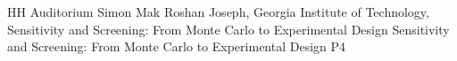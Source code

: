 \tablePlenary{} %
{HH Auditorium}	%
{Simon Mak}		%
{Roshan Joseph, Georgia Institute of Technology, Sensitivity and Screening: From Monte Carlo to Experimental Design}	%
{Sensitivity and Screening: From Monte Carlo to Experimental Design}		%
{P4}		%
\\\hline

